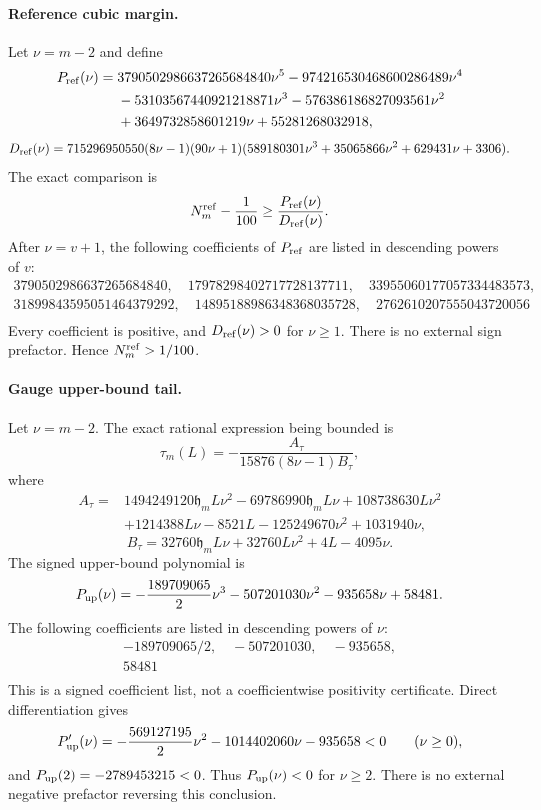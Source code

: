 \paragraph{Reference cubic margin.} Let $\nu=m-2$ and define
\[
\begin{split}
 P_{\rm ref}(\nu)={}&3790502986637265684840\nu^5
 -974216530468600286489\nu^4\\
 &-53103567440921218871\nu^3
 -576386186827093561\nu^2\\
 &+3649732858601219\nu+55281268032918,
\end{split}
\]
\[
 D_{\rm ref}(\nu)=715296950550(8\nu-1)(90\nu+1)
 (589180301\nu^3+35065866\nu^2+629431\nu+3306).
\]
The exact comparison is
\[
 N_m^{\rm ref}-\frac1{100}\ge
 \frac{P_{\rm ref}(\nu)}{D_{\rm ref}(\nu)}.
\]
After $\nu=v+1$, the following coefficients of $P_{\rm ref}$ are listed in
descending powers of $v$:
\[
\begin{gathered}
3790502986637265684840,\quad 17978298402717728137711,\quad 33955060177057334483573,\\
31899843595051464379292,\quad 14895188986348368035728,\quad 2762610207555043720056\\
\end{gathered}
\]\noindent Every coefficient is positive, and $D_{\rm ref}(\nu)>0$ for
$\nu\ge1$.  There is no external sign prefactor.  Hence
$N_m^{\rm ref}>1/100$.

\paragraph{Gauge upper-bound tail.} Let $\nu=m-2$.  The exact rational expression being bounded is
\[
 \tau_m(L)=-\frac{A_\tau}{15876(8\nu-1)B_\tau},
\]
where
\[
\begin{split}
 A_\tau={}&1494249120\mathfrak h_mL\nu^2
 -69786990\mathfrak h_mL\nu+108738630L\nu^2\\
 &+1214388L\nu-8521L-125249670\nu^2+1031940\nu,
\end{split}
\]
\[
 B_\tau=32760\mathfrak h_mL\nu+32760L\nu^2+4L-4095\nu.
\]
The signed upper-bound polynomial is
\[
 P_{\rm up}(\nu)=-\frac{189709065}{2}\nu^3-507201030\nu^2
 -935658\nu+58481.
\]
The following coefficients are listed in descending powers of $\nu$:
\[
\begin{gathered}
-189709065/2,\quad -507201030,\quad -935658,\\
58481\\
\end{gathered}
\]\noindent This is a signed coefficient list, not a coefficientwise
positivity certificate.  Direct differentiation gives
\[
 P_{\rm up}'(\nu)=-\frac{569127195}{2}\nu^2
 -1014402060\nu-935658<0\qquad(\nu\ge0),
\]
and $P_{\rm up}(2)=-2789453215<0$.  Thus $P_{\rm up}(\nu)<0$ for
$\nu\ge2$.  There is no external negative prefactor reversing this
conclusion.

